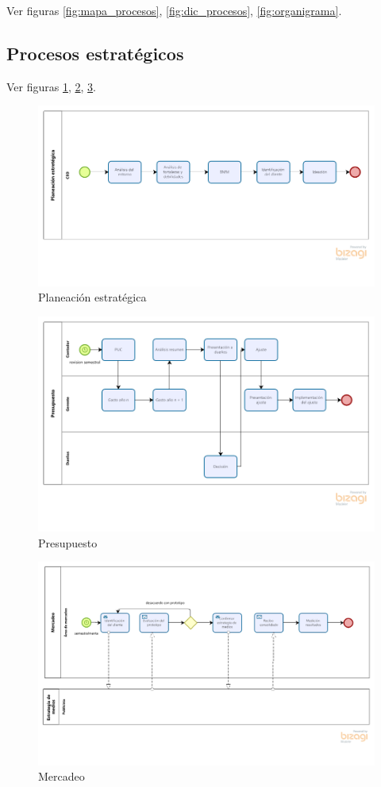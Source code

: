 \documentclass[11pt]{article}
\begin{document}
Ver figuras \ref{fig:mapa_procesos}, \ref{fig:dic_procesos}, \ref{fig:organigrama}.

\subsection{Procesos estratégicos}

Ver figuras \ref{fig:planeacion}, \ref{fig:presupuesto}, \ref{fig:mercadeo}.
\begin{figure}[H]
\centering
\includegraphics[width=.9\linewidth]{./assets/build/planeacion.png}
\caption{\label{fig:planeacion}Planeación estratégica}
\end{figure}

\begin{figure}[H]
\centering
\includegraphics[width=.9\linewidth]{./assets/build/presupuesto.png}
\caption{\label{fig:presupuesto}Presupuesto}
\end{figure}

\begin{figure}[H]
\centering
\includegraphics[width=.9\linewidth]{./assets/build/mercadeo.png}
\caption{\label{fig:mercadeo} Mercadeo}
\end{figure}
\end{document}
